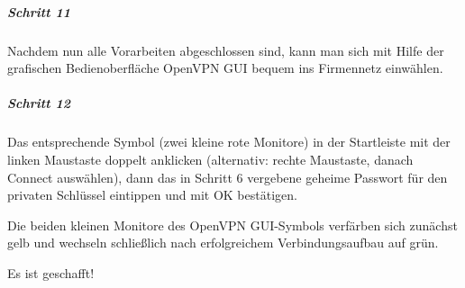 \subparagraph{Schritt 11}

Nachdem nun alle Vorarbeiten abgeschlossen sind, kann man sich mit Hilfe der
grafischen Bedienoberfläche OpenVPN GUI bequem ins Firmennetz einwählen.

\subparagraph{Schritt 12}

Das entsprechende Symbol (zwei kleine rote Monitore) in der Startleiste mit der
linken Maustaste doppelt anklicken (alternativ: rechte Maustaste, danach
\glqq{}Connect\grqq{} auswählen), dann das in Schritt 6 vergebene geheime Passwort für den
privaten Schlüssel eintippen und mit \glqq{}OK\grqq{} bestätigen.

Die beiden kleinen Monitore des OpenVPN GUI-Symbols verfärben sich zunächst gelb
und wechseln schließlich nach erfolgreichem Verbindungsaufbau auf grün.

Es ist geschafft!

